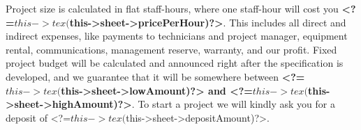 
Project size is calculated in flat staff-hours, where one staff-hour
will cost you \textbf{<?=$this->tex($this->sheet->pricePerHour)?>}. This includes
all direct and indirect expenses, like payments to technicians and project 
manager, equipment rental, communications, management reserve, warranty,
and our profit. Fixed project budget will be calculated and announced
right after the specification is developed, and we guarantee that it
will be somewhere between \textbf{<?=$this->tex($this->sheet->lowAmount)?>{}
and <?=$this->tex($this->sheet->highAmount)?>}.
To start a project we will kindly ask you for a deposit
of <?=$this->tex($this->sheet->depositAmount)?>.
